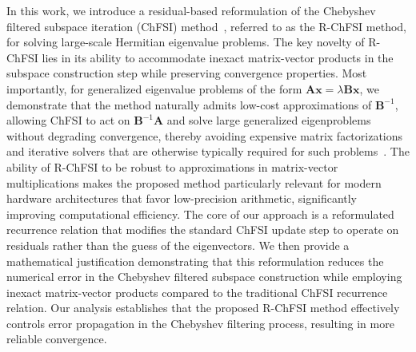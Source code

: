 \documentclass[preprint,3p,number,sort&compress]{elsarticle}
\newcommand{\bx}{\textbf{x}}
\newcommand{\bA}{\textbf{A}}
\newcommand{\bB}{\textbf{B}}
\begin{document}
In this work, we introduce a residual-based reformulation of the Chebyshev filtered subspace iteration (ChFSI) method~\cite{saadChebyshevAccelerationTechniques1984,zhouParallelSelfconsistentfieldCalculations2006,zhouSelfconsistentfieldCalculationsUsing2006,zhouChebyshevfilteredSubspaceIteration2014}, referred to as the R-ChFSI method, for solving large-scale Hermitian eigenvalue problems. The key novelty of R-ChFSI lies in its ability to accommodate inexact matrix-vector products in the subspace construction step while preserving convergence properties. Most importantly, for generalized eigenvalue problems of the form $\bA\bx=\lambda\bB\bx$, we demonstrate that the method naturally admits low-cost approximations of $\bB^{-1}$, allowing ChFSI to act on $\bB^{-1}\bA$ and solve large generalized eigenproblems without degrading convergence, thereby avoiding 
expensive matrix factorizations and iterative solvers that are otherwise typically required for such problems~\cite{levittParallelEigensolversPlanewave2015}. The ability of R-ChFSI to be robust to approximations in matrix-vector multiplications makes the proposed method particularly relevant for modern hardware architectures that favor low-precision arithmetic, significantly improving computational efficiency. The core of our approach is a reformulated recurrence relation that modifies the standard ChFSI update step to operate on residuals rather than the guess of the eigenvectors. We then provide a mathematical justification demonstrating that this reformulation reduces the numerical error in the Chebyshev filtered subspace construction while employing inexact matrix-vector products compared to the traditional ChFSI recurrence relation. Our analysis establishes that the proposed R-ChFSI method effectively controls error propagation in the Chebyshev filtering process, resulting in more reliable convergence.
\end{document}
